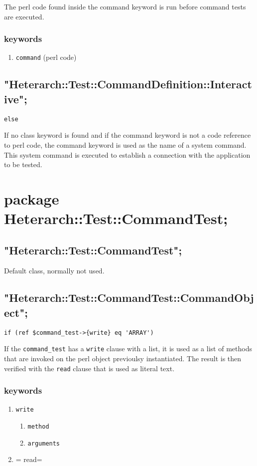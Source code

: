 \documentclass[11pt]{article}
\begin{document}
The perl code found inside the command keyword is run before command
tests are executed.

\subsubsection{keywords}
\label{sec-3-4-1}
\begin{enumerate}
\item \texttt{command} (perl code)
\label{sec-3-4-1-1}
\end{enumerate}

\subsection{"Heterarch::Test::CommandDefinition::Interactive";}
\label{sec-3-5}
\begin{verbatim}
else
\end{verbatim}

If no class keyword is found and if the command keyword is not a code
reference to perl code, the command keyword is used as the name of a
system command.  This system command is executed to establish a
connection with the application to be tested.


\section{package Heterarch::Test::CommandTest;}
\label{sec-4}
\subsection{"Heterarch::Test::CommandTest";}
\label{sec-4-1}
Default class, normally not used.

\subsection{"Heterarch::Test::CommandTest::CommandObject";}
\label{sec-4-2}
\begin{verbatim}
if (ref $command_test->{write} eq 'ARRAY')
\end{verbatim}

If the \verb~command_test~ has a \verb~write~ clause with a list, it is used as
a list of methods that are invoked on the perl object previoulsy
instantiated.  The result is then verified with the \verb~read~ clause that
is used as literal text.

\subsubsection{keywords}
\label{sec-4-2-1}
\begin{enumerate}
\item \texttt{write}
\label{sec-4-2-1-1}
\begin{enumerate}
\item \texttt{method}
\label{sec-4-2-1-1-1}
\item \texttt{arguments}
\label{sec-4-2-1-1-2}
\end{enumerate}
\item = read=
\label{sec-4-2-1-2}
\end{enumerate}
\end{document}
